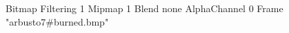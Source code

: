 {Bitmap
	{Filtering 1}
	{Mipmap 1}
	{Blend none}
	{AlphaChannel 0}
	{Frame "arbusto7#burned.bmp"}
}
